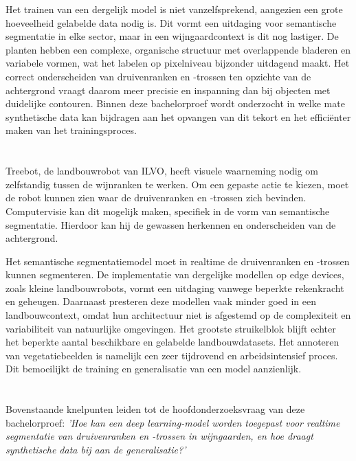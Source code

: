 Het trainen van een dergelijk model is niet vanzelfsprekend, aangezien een grote hoeveelheid gelabelde data nodig is. Dit vormt een uitdaging voor semantische segmentatie in elke sector, maar in een wijngaardcontext is dit nog lastiger. De planten hebben een complexe, organische structuur met overlappende bladeren en variabele vormen, wat het labelen op pixelniveau bijzonder uitdagend maakt. Het correct onderscheiden van druivenranken en -trossen ten opzichte van de achtergrond vraagt daarom meer precisie en inspanning dan bij objecten met duidelijke contouren. Binnen deze bachelorproef wordt onderzocht in welke mate synthetische data kan bijdragen aan het opvangen van dit tekort en het efficiënter maken van het trainingsproces.

\section{}%
\label{sec:probleemstelling}

Treebot, de landbouwrobot van ILVO, heeft visuele waarneming nodig om zelfstandig tussen de wijnranken te werken. Om een gepaste actie te kiezen, moet de robot kunnen zien waar de druivenranken en -trossen zich bevinden. Computervisie kan dit mogelijk maken, specifiek in de vorm van semantische segmentatie. Hierdoor kan hij de gewassen herkennen en onderscheiden van de achtergrond.

Het semantische segmentatiemodel moet in realtime de druivenranken en -trossen kunnen segmenteren. De implementatie van dergelijke modellen op edge devices, zoals kleine landbouwrobots, vormt een uitdaging vanwege beperkte rekenkracht en geheugen. Daarnaast presteren deze modellen vaak minder goed in een landbouwcontext, omdat hun architectuur niet is afgestemd op de complexiteit en variabiliteit van natuurlijke omgevingen. Het grootste struikelblok blijft echter het beperkte aantal beschikbare en gelabelde landbouwdatasets. Het annoteren van vegetatiebeelden is namelijk een zeer tijdrovend en arbeidsintensief proces. Dit bemoeilijkt de training en generalisatie van een model aanzienlijk.

\section{}%
\label{sec:onderzoeksvraag}

Bovenstaande knelpunten leiden tot de hoofdonderzoeksvraag van deze bachelorproef: \emph{'Hoe kan een deep learning-model worden toegepast voor realtime segmentatie van druivenranken en -trossen in wijngaarden, en hoe draagt synthetische data bij aan de generalisatie?'} 

